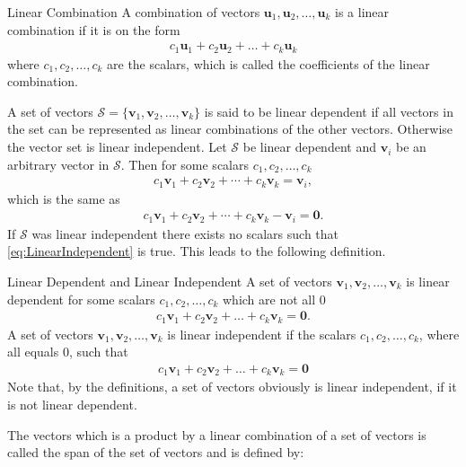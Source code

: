 \begin{definition}{Linear Combination}
    A combination of vectors $\textbf{u}_1, \textbf{u}_2, \hdots, \textbf{u}_k$ is a linear combination if it is on the form
    \begin{align*}
        c_1\textbf{u}_1 + c_2\textbf{u}_2 + \hdots + c_k\textbf{u}_k
    \end{align*}
    where $c_1, c_2, \hdots, c_k$ are the scalars, which is called the coefficients of the linear combination. \cite[14]{LiAl} 
\end{definition}
A set of vectors $\mathcal{S}=\{\textbf{v}_1, \textbf{v}_2, \hdots, \textbf{v}_k\}$ is said to be linear dependent if all vectors in the set can be represented as linear combinations of the other vectors. Otherwise the vector set is linear independent.
Let $\mathcal{S}$ be linear dependent and $\textbf{v}_i$ be an arbitrary vector in $\mathcal{S}$. Then for some scalars $c_1, c_2, \hdots, c_k$
\begin{align} \label{eq:LinearIndependent}
    c_1\textbf{v}_1+c_2\textbf{v}_2+\cdots+c_k\textbf{v}_k=\textbf{v}_i,
\end{align}
which is the same as
  \begin{align*}
    c_1\textbf{v}_1+c_2\textbf{v}_2+\cdots+c_k\textbf{v}_k-\textbf{v}_i=\textbf{0}. 
 \end{align*}
 If $\mathcal{S}$ was linear independent there exists no scalars such that \eqref{eq:LinearIndependent} is true. This leads to the following definition.
\begin{definition}{Linear Dependent and Linear Independent} \label{def:LinearDependent}
    A set of vectors $\textbf{v}_1, \textbf{v}_2, \hdots, \textbf{v}_k$ is linear dependent for some scalars $c_1, c_2, \hdots, c_k$ which are not all $0$
    \begin{align*}
       c_1\textbf{v}_1+c_2\textbf{v}_2+\dots+c_k\textbf{v}_k=\textbf{0}.
    \end{align*}
    A set of vectors $\textbf{v}_1, \textbf{v}_2, \hdots, \textbf{v}_k$ is linear independent if the scalars $c_1, c_2, \hdots, c_k$, where all equals 0, such that
    \begin{align*}
        c_1\textbf{v}_1+c_2\textbf{v}_2+\dots+c_k\textbf{v}_k=\textbf{0}
    \end{align*}
    Note that, by the definitions, a set of vectors obviously is linear independent, if it is not linear dependent. \cite[75-76]{LiAl} 
\end{definition}
\noindent The vectors which is a product by a linear combination of a set of vectors is called the span of the set of vectors and is defined by:
